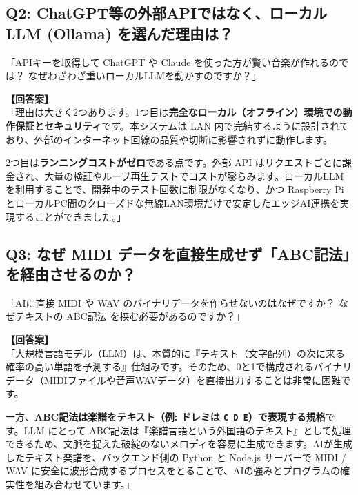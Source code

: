 \documentclass[a4paper,11pt]{jlreq}
\begin{document}
\subsection{Q2: ChatGPT等の外部APIではなく、ローカルLLM (Ollama) を選んだ理由は？}

\begin{tcolorbox}[qbox, title=質問の要旨]
「APIキーを取得して ChatGPT や Claude を使った方が賢い音楽が作れるのでは？ なぜわざわざ重いローカルLLMを動かすのですか？」
\end{tcolorbox}

\begin{tcolorbox}[abox]
\textbf{【回答案】} \\
「理由は大きく2つあります。1つ目は\textbf{完全なローカル（オフライン）環境での動作保証とセキュリティ}です。本システムは LAN 内で完結するように設計されており、外部のインターネット回線の品質や切断に影響されずに動作します。

2つ目は\textbf{ランニングコストがゼロ}である点です。外部 API はリクエストごとに課金され、大量の検証やループ再生テストでコストが膨らみます。ローカルLLMを利用することで、開発中のテスト回数に制限がなくなり、かつ Raspberry Pi とローカルPC間のクローズドな無線LAN環境だけで安定したエッジAI連携を実現することができました。」
\end{tcolorbox}

\subsection{Q3: なぜ MIDI データを直接生成せず「ABC記法」を経由させるのか？}

\begin{tcolorbox}[qbox, title=質問の要旨]
「AIに直接 MIDI や WAV のバイナリデータを作らせないのはなぜですか？ なぜテキストの ABC記法 を挟む必要があるのですか？」
\end{tcolorbox}

\begin{tcolorbox}[abox]
\textbf{【回答案】} \\
「大規模言語モデル（LLM）は、本質的に『テキスト（文字配列）の次に来る確率の高い単語を予測する』仕組みです。そのため、0と1で構成されるバイナリデータ（MIDIファイルや音声WAVデータ）を直接出力することは非常に困難です。

一方、\textbf{ABC記法は楽譜をテキスト（例: ドレミは \texttt{C D E}）で表現する規格}です。LLM にとって ABC記法は『楽譜言語という外国語のテキスト』として処理できるため、文脈を捉えた破綻のないメロディを容易に生成できます。AIが生成したテキスト楽譜を、バックエンド側の Python と Node.js サーバーで MIDI / WAV に安全に波形合成するプロセスをとることで、AIの強みとプログラムの確実性を組み合わせています。」
\end{tcolorbox}
\end{document}
